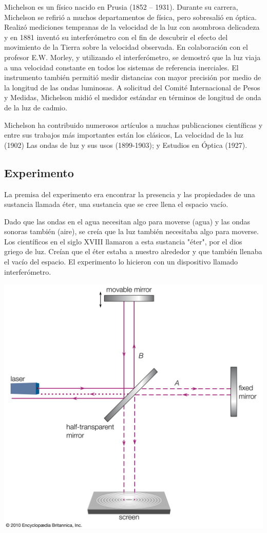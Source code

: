 \documentclass[letterpaper, 10pt, journal]{IEEEtran}
\begin{document}
Michelson es un físico nacido en Prusia (1852 – 1931). Durante su carrera, Michelson se refirió a muchos departamentos de física, pero sobresalió en óptica. Realizó mediciones tempranas de la velocidad de la luz con asombrosa delicadeza y en 1881 inventó su interferómetro con el fin de descubrir el efecto del movimiento de la Tierra sobre la velocidad observada. En colaboración con el profesor E.W. Morley, y utilizando el interferómetro, se demostró que la luz viaja a una velocidad constante en todos los sistemas de referencia inerciales. El instrumento también permitió medir distancias con mayor precisión por medio de la longitud de las ondas luminosas. A solicitud del Comité Internacional de Pesos y Medidas, Michelson midió el medidor estándar en términos de longitud de onda de la luz de cadmio. 

Michelson ha contribuido numerosos artículos a muchas publicaciones científicas y entre sus trabajos más importantes están los clásicos, La velocidad de la luz (1902) Las ondas de luz y sus usos (1899-1903); y Estudios en Óptica (1927).

\subsection{Experimento}
La premisa del experimento era encontrar la presencia y las propiedades de una sustancia llamada éter, una sustancia que se cree llena el espacio vacío. 

Dado que las ondas en el agua necesitan algo para moverse (agua) y las ondas sonoras también (aire), se creía que la luz también necesitaba algo para moverse. Los científicos en el siglo XVIII llamaron a esta sustancia "éter", por el dios griego de luz. Creían que el éter estaba a nuestro alrededor y que también llenaba el vacío del espacio. El experimento lo hicieron con un dispositivo llamado interferómetro.

\includegraphics[scale=0.15]{luz}
\end{document}
